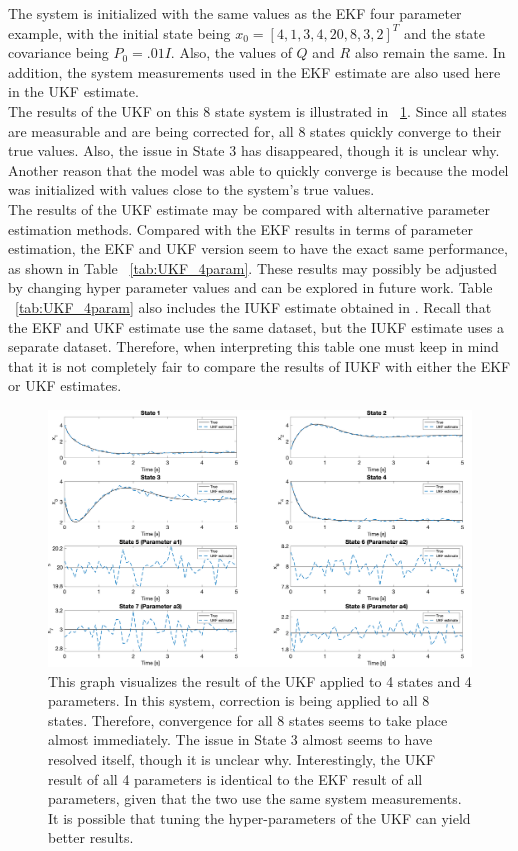 \noindent The system is initialized with the same values as the EKF four parameter example, with the initial state being $x_0 = [4, 1, 3, 4, 20, 8, 3, 2]^T$ and the state covariance being $P_0 = .01I$. Also, the values of $Q$ and $R$ also remain the same. In addition, the system measurements used in the EKF estimate are also used here in the UKF estimate.  \\

\noindent The results of the UKF on this 8 state system is illustrated in ~\ref{fig:UKF_4param}. Since all states are measurable and are being corrected for, all 8 states quickly converge to their true values. Also, the issue in State 3 has disappeared, though it is unclear why. Another reason that the model was able to quickly converge is because the model was initialized with values close to the system's true values. \\

\noindent The results of the UKF estimate may be compared with alternative parameter estimation methods. Compared with the EKF results in terms of parameter estimation, the EKF and UKF version seem to have the exact same performance, as shown in Table ~\ref{tab:UKF_4param}. These results may possibly be adjusted by changing hyper parameter values and can be explored in future work. Table ~\ref{tab:UKF_4param} also includes the IUKF estimate obtained in \cite{article5}. Recall that the EKF and UKF estimate use the same dataset, but the IUKF estimate uses a separate dataset. Therefore, when interpreting this table one must keep in mind that it is not completely fair to compare the results of IUKF with either the EKF or UKF estimates.



\newpage

\begin{figure}[ht]
    \centering
    \includegraphics[scale = 0.3]{UKF_4param.png}
    \caption{This graph visualizes the result of the UKF applied to 4 states and 4 parameters. In this system, correction is being applied to all 8 states. Therefore, convergence for all 8 states seems to take place almost immediately. The issue in State 3 almost seems to have resolved itself, though it is unclear why. Interestingly, the UKF result of all 4 parameters is identical to the EKF result of all parameters, given that the two use the same system measurements. It is possible that tuning the hyper-parameters of the UKF can yield better results.  }
    \label{fig:UKF_4param}
\end{figure}

